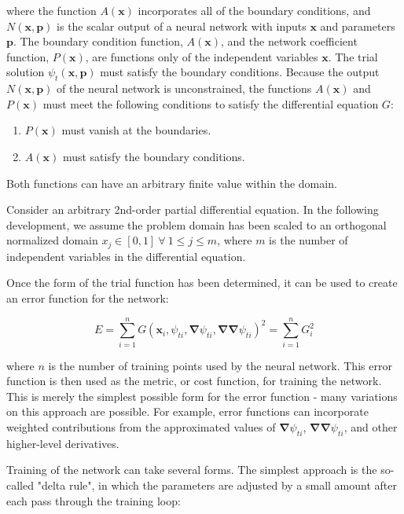\documentclass{article}
\begin{document}
\noindent where the function $A(\mathbf x)$ incorporates all of the boundary conditions, and $N(\mathbf x, \mathbf p)$ is the scalar output of a neural network with inputs $\mathbf x$ and parameters $\mathbf p$. The boundary condition function, $A(\mathbf x)$, and the network coefficient function, $P(\mathbf x)$, are functions only of the independent variables $\mathbf x$. The trial solution $\psi_t(\mathbf x,\mathbf p)$ must satisfy the boundary conditions. Because the output $N(\mathbf x,\mathbf p)$ of the neural network is unconstrained, the functions $A(\mathbf x)$ and $P(\mathbf x)$ must meet the following conditions to satisfy the differential equation $G$:

\begin{enumerate}
  \item $P(\mathbf x)$ must vanish at the boundaries.
  \item $A(\mathbf x)$ must satisfy the boundary conditions.
\end{enumerate}

\noindent Both functions can have an arbitrary finite value within the domain.

Consider an arbitrary 2nd-order partial differential equation. In the following development, we assume the problem domain has been scaled to an orthogonal normalized domain $x_j \in [0,1] \ \forall \ 1 \le j \leq m$, where $m$ is the number of independent variables in the differential equation.

Once the form of the trial function has been determined, it can be used to create an error function for the network:

\begin{equation}
  E = \sum_{i=1}^n G(\mathbf x_i,\psi_{ti},\mathbf \nabla \psi_{ti},\mathbf \nabla \mathbf \nabla \psi_{ti})^2 = \sum_{i=1}^n G_i^2
  \label{eq:errorfunction}
\end{equation}

\noindent where $n$ is the number of training points used by the neural network. This error function is then used as the metric, or cost function, for training the network. This is merely the simplest possible form for the error function - many variations on this approach are possible. For example, error functions can incorporate weighted contributions from the approximated values of $\mathbf \nabla \psi_{ti}$, $\mathbf \nabla \mathbf \nabla \psi_{ti}$, and other higher-level derivatives.

Training of the network can take several forms. The simplest approach is the so-called "delta rule", in which the parameters are adjusted by a small amount after each pass through the training loop:
\end{document}
